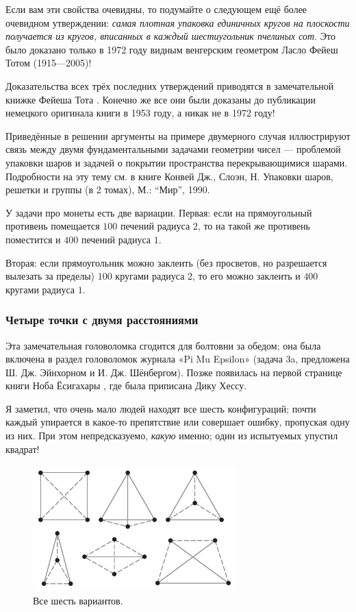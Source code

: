 Если вам эти свойства очевидны, то подумайте о следующем ещё более очевидном утверждении: \emph{самая плотная упаковка единичных кругов на  плоскости получается из кругов, вписанных в каждый шестиугольник пчелиных сот}.
Это было доказано только в 1972 году видным венгерским геометром Ласло Фейеш Тотом (1915---2005)!

\begin{addedbytheeditors}
Доказательства всех трёх последних утверждений приводятся в замечательной книжке Фейеша Тота \cite[III §3]{tot}.
Конечно же все они были доказаны до публикации немецкого оригинала книги в 1953 году, а никак не в 1972 году!

Приведённые в решении аргументы на примере двумерного случая иллюстрируют связь между двумя фундаментальными задачами геометрии чисел --- проблемой упаковки шаров и задачей о покрытии пространства перекрывающимися шарами. Подробности на эту тему см. в книге Конвей Дж.,  Слоэн, Н. Упаковки шаров, решетки и группы (в 2 томах), М.: ``Мир'', 1990. 

У задачи про монеты есть две вариации. Первая: если на прямоугольный противень помещается $100$ печений радиуса $2$, то  на такой же противень поместится и $400$ печений радиуса $1$.

Вторая: если прямоугольник можно заклеить (без просветов, но разрешается вылезать за пределы) $100$ кругами радиуса $2$, то его можно заклеить и $400$ кругами радиуса $1$.
\pr
\end{addedbytheeditors}

\subsubsection*{Четыре точки с двумя расстояниями}

Эта замечательная головоломка сгодится для болтовни за обедом;
она была включена в раздел головоломок журнала «Pi Mu Epsilon» \cite[1985 год]{16} (задача 3a, предложена Ш. Дж. Эйнхорном и И. Дж. Шёнбергом).
Позже появилась на первой странице книги Ноба Ёсигахары \cite{61}, где была приписана Дику Хессу.

Я заметил, что очень мало людей находят все шесть конфигураций;
почти каждый упирается в какое-то препятствие или совершает ошибку, пропуская одну из них.
При этом непредсказуемо, \emph{какую} именно; один из испытуемых упустил квадрат!

\begin{figure}[h!]
\centering
\includegraphics[scale=1]{pics/2dist}
\caption{Все шесть вариантов.}
\label{pic:2dist}
\end{figure}

